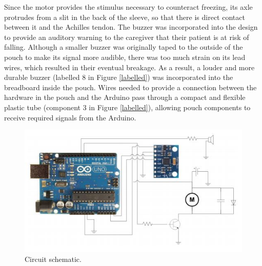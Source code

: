 \documentclass[titlepage]{article}
\begin{document}
\begin{doublespacing}
Since the motor provides the stimulus necessary to counteract freezing, its axle protrudes from a slit in the back of the sleeve, so that there is direct contact between it and the Achilles tendon. The buzzer was incorporated into the design to provide an auditory warning to the caregiver that their patient is at risk of falling. Although a smaller buzzer was originally taped to the outside of the pouch to make its signal more audible, there was too much strain on its lead wires, which resulted in their eventual breakage. As a result, a louder and more durable buzzer (labelled 8 in Figure \ref{labelled}) was incorporated into the breadboard inside the pouch. Wires needed to provide a connection between the hardware in the pouch and the Arduino pass through a compact and flexible plastic tube (component 3 in Figure \ref{labelled}), allowing pouch components to receive required signals from the Arduino.

\begin{figure}[H]
	\centering
\begin{minipage}{.9\textwidth}
	\includegraphics[width=\linewidth]{arduino}
	\caption{Circuit schematic.}
	\label{arduino}
\end{minipage}
\end{figure}


\end{doublespacing}
\end{document}
